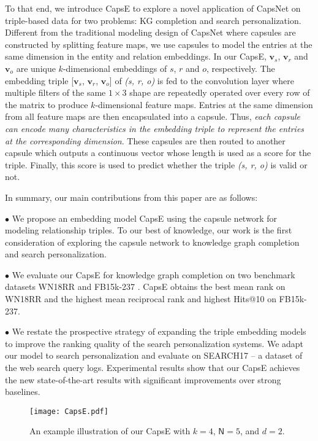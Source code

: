 \documentclass[11pt,a4paper]{article}
\begin{document}
To that end, we introduce CapsE to explore a novel application of CapsNet on triple-based data for two problems: KG completion and search personalization. Different from the traditional modeling design of CapsNet where capsules are constructed by splitting feature maps, we use capsules to model the entries at the same dimension in the entity and relation embeddings.
In our CapsE, $\boldsymbol{v}_s$, $\boldsymbol{v}_r$ and $\boldsymbol{v}_o$ are unique $k$-dimensional embeddings of $s$, $r$ and $o$, respectively. 
The embedding triple [$\boldsymbol{v}_s$, $\boldsymbol{v}_r$, $\boldsymbol{v}_o$] of \textit{(s, r, o)} is fed to the convolution layer where multiple filters of the same $1\times3$ shape are repeatedly operated over every row of the matrix to produce  $k$-dimensional feature maps.
Entries at the same dimension from all feature maps are then encapsulated into a capsule.
Thus, \textit{each capsule can encode many characteristics in the embedding triple to represent the entries at the corresponding dimension}.
These capsules are then routed to another capsule which outputs a continuous vector whose length is used as a score for the triple.
Finally, this score is used to predict whether the triple \textit{(s, r, o)} is valid or not.

In summary, our main contributions from this paper are as follows:

$\bullet$ We propose an embedding model CapsE using the capsule network \citep{sabour2017dynamic} for modeling relationship triples.
To our best of knowledge, our work is the first consideration of exploring the capsule network to knowledge graph completion and search personalization.

$\bullet$ We evaluate our  CapsE for knowledge graph completion on two benchmark datasets WN18RR \citep{Dettmers2017} and FB15k-237 \citep{toutanova-chen:2015:CVSC}. CapsE obtains the best mean rank on WN18RR and the highest mean reciprocal rank and highest Hits@10 on FB15k-237.

$\bullet$ We restate the prospective strategy of expanding the triple embedding models to improve the ranking quality of the search personalization systems.
We adapt our model to search personalization and evaluate on SEARCH17 \citep{vu2017search} -- a dataset of the web search query logs.  Experimental  results show  that our CapsE achieves the new state-of-the-art results with significant improvements over strong baselines.



\begin{figure*}[ht]
\centering
\texttt{[image: CapsE.pdf]}
\caption{An example illustration of our CapsE with $k=4$, $\mathsf{N}=5$, and $d = 2$.}
\label{fig:model}
\end{figure*}
\end{document}
